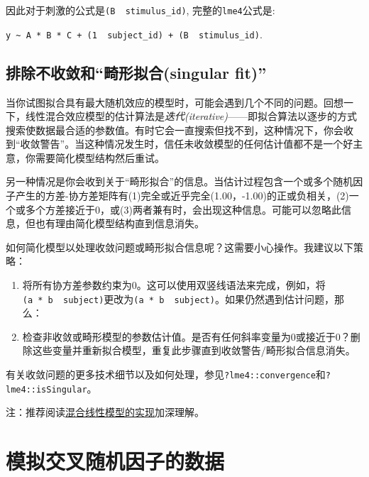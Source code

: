\documentclass[
]{book}
\providecommand{\tightlist}{%
  \setlength{\itemsep}{0pt}\setlength{\parskip}{0pt}}
\begin{document}
因此对于刺激的公式是\texttt{(B\ \textbar{}\ stimulus\_id)}, 完整的\texttt{lme4}公式是:

\texttt{y\ \textasciitilde{}\ A\ *\ B\ *\ C\ +\ (1\ \textbar{}\ subject\_id)\ +\ (B\ \textbar{}\ stimulus\_id)}.

\hypertarget{ux6392ux9664ux4e0dux6536ux655bux548cux7578ux5f62ux62dfux5408singular-fit}{%
\subsection{排除不收敛和``畸形拟合(singular fit)''}\label{ux6392ux9664ux4e0dux6536ux655bux548cux7578ux5f62ux62dfux5408singular-fit}}

当你试图拟合具有最大随机效应的模型时，可能会遇到几个不同的问题。回想一下，线性混合效应模型的估计算法是\emph{迭代(iterative)}------即拟合算法以逐步的方式搜索使数据最合适的参数值。有时它会一直搜索但找不到，这种情况下，你会收到``收敛警告''。当这种情况发生时，信任未收敛模型的任何估计值都不是一个好主意，你需要简化模型结构然后重试。

另一种情况是你会收到关于``畸形拟合''的信息。当估计过程包含一个或多个随机因子产生的方差-协方差矩阵有(1)完全或近乎完全(1.00，-1.00)的正或负相关，(2)一个或多个方差接近于0，或(3)两者兼有时，会出现这种信息。可能可以忽略此信息，但也有理由简化模型结构直到信息消失。

如何简化模型以处理收敛问题或畸形拟合信息呢？这需要小心操作。我建议以下策略：

\begin{enumerate}
\def\labelenumi{\arabic{enumi}.}
\tightlist
\item
  将所有协方差参数约束为0。这可以使用双竖线\texttt{\textbar{}\textbar{}}语法来完成，例如，将\texttt{(a\ *\ b\ \textbar{}\ subject)}更改为\texttt{(a\ *\ b\ \textbar{}\textbar{}\ subject)}。如果仍然遇到估计问题，那么：
\item
  检查非收敛或畸形模型的参数估计值。是否有任何斜率变量为0或接近于0？删除这些变量并重新拟合模型，重复此步骤直到收敛警告/畸形拟合信息消失。
\end{enumerate}

有关收敛问题的更多技术细节以及如何处理，参见\texttt{?lme4::convergence}和\texttt{?lme4::isSingular}。

注：推荐阅读\href{https://github.com/usplos/Eye-movement-related/blob/master/Linear\%20mixed\%20model\%20(Hierarchical\%20linear\%20model)\%20using\%20R\%20and\%20JAMOVI.md}{混合线性模型的实现}加深理解。

\hypertarget{ux6a21ux62dfux4ea4ux53c9ux968fux673aux56e0ux5b50ux7684ux6570ux636e}{%
\section{模拟交叉随机因子的数据}\label{ux6a21ux62dfux4ea4ux53c9ux968fux673aux56e0ux5b50ux7684ux6570ux636e}}
\end{document}
